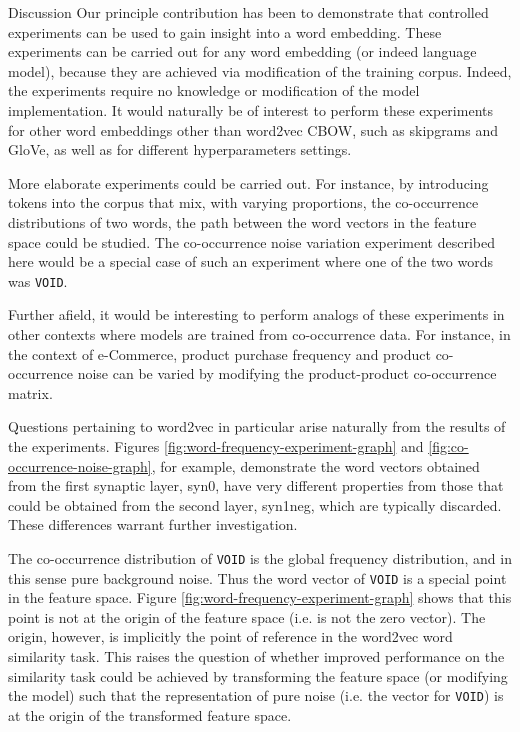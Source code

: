 \documentclass{article} %
\newcommand{\word}[1]{\texttt{#1}}
\begin{document}
\begin{section}{Discussion}\label{future-directions}
Our principle contribution has been to demonstrate that controlled experiments can be used to gain insight into a word embedding.
These experiments can be carried out for any word embedding (or indeed language model), because they are achieved via modification of the training corpus.
Indeed, the experiments require no knowledge or modification of the model implementation.
It would naturally be of interest to perform these experiments for other word embeddings other than word2vec CBOW, such as skipgrams and GloVe, as well as for different hyperparameters settings.

More elaborate experiments could be carried out.
For instance, by introducing tokens into the corpus that mix, with varying proportions, the co-occurrence distributions of two words, the path between the word vectors in the feature space could be studied.
The co-occurrence noise variation experiment described here would be a special case of such an experiment where one of the two words was \word{VOID}.

Further afield, it would be interesting to perform analogs of these experiments in other contexts where models are trained from co-occurrence data.
For instance, in the context of e-Commerce, product purchase frequency and product co-occurrence noise can be varied by modifying the product-product co-occurrence matrix.

Questions pertaining to word2vec in particular arise naturally from the results of the experiments.
Figures \ref{fig:word-frequency-experiment-graph} and \ref{fig:co-occurrence-noise-graph}, for example, demonstrate the word vectors obtained from the first synaptic layer, syn0, have very different properties from those that could be obtained from the second layer, syn1neg, which are typically discarded.
These differences warrant further investigation.

The co-occurrence distribution of \word{VOID} is the global frequency distribution, and in this sense pure background noise.
Thus the word vector of \word{VOID} is a special point in the feature space.
Figure \ref{fig:word-frequency-experiment-graph} shows that this point is not at the origin of the feature space (i.e. is not the zero vector).
The origin, however, is implicitly the point of reference in the word2vec word similarity task.
This raises the question of whether improved performance on the similarity task could be achieved by transforming the feature space (or modifying the model) such that the representation of pure noise (i.e. the vector for \word{VOID}) is at the origin of the transformed feature space. 



\end{section}

\clearpage
\footnotesize


\end{document}
